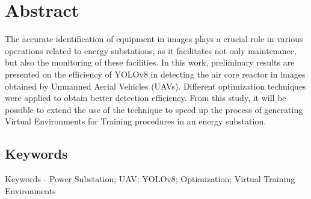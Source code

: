 \newpage
\thispagestyle{empty}
\chapter*{Abstract}
\vspace{-35pt}
The accurate identification of equipment in images plays a crucial role in various operations related to energy substations, as it facilitates not only maintenance, but also the monitoring of these facilities. In this work, preliminary results are presented on the efficiency of YOLOv8 in detecting the air core reactor in images obtained by Unmanned Aerial Vehicles (UAVs). Different optimization techniques were applied to obtain better detection efficiency. From this study, it will be possible to extend the use of the technique to speed up the process of generating Virtual Environments for Training procedures in an energy substation.
\section*{Keywords}
Keywords - Power Substation; UAV; YOLOv8; Optimization; Virtual Training Environments
